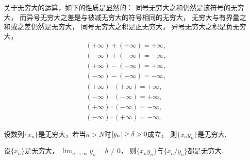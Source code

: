 关于无穷大的运算，如下的性质是显然的：
同号无穷大之和仍然是该符号的无穷大，
而异号无穷大之差是与被减无穷大的符号相同的无穷大，
无穷大与有界量之和或之差仍然是无穷大，
同号无穷大之积是正无穷大，
异号无穷大之积是负无穷大，
\begin{gather*}
	(+\infty) + (+\infty) = +\infty, \\
	(-\infty) + (-\infty) = -\infty, \\
	(+\infty) - (-\infty) = +\infty, \\
	(-\infty) - (+\infty) = -\infty, \\
	(+\infty) \cdot (+\infty) = +\infty, \\
	(-\infty) \cdot (-\infty) = +\infty, \\
	(+\infty) \cdot (-\infty) = -\infty, \\
	(-\infty) \cdot (+\infty) = -\infty.
\end{gather*}

\begin{theorem}
设数列\(\{x_n\}\)是无穷大，若当\(n>N\)时\(\abs{y_n}\geq\delta>0\)成立，
则\(\{x_n y_n\}\)是无穷大.
\end{theorem}

\begin{corollary}
设\(\{x_n\}\)是无穷大，
\(\lim_{n\to\infty} y_n = b \neq 0\)，
则\(\{x_n y_n\}\)与\(\{x_n/y_n\}\)都是无穷大.
\end{corollary}
